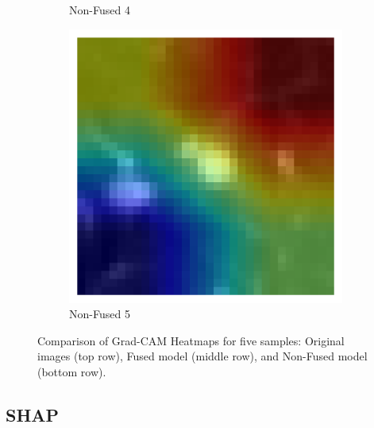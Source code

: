\begin{figure}[htbp]
\begin{subfigure}[b]{0.18\textwidth}
        \caption*{Non-Fused 4}
    \end{subfigure}
    \begin{subfigure}[b]{0.18\textwidth}
        \centering
        \includegraphics[width=\linewidth]{figures/heatmaps/ex5/sample_gradcam_non_fused.png}
        \caption*{Non-Fused 5}
    \end{subfigure}

    \caption[Grad-CAM Heatmap Comparison]{Comparison of Grad-CAM Heatmaps for five samples: Original images (top row), Fused model (middle row), and Non-Fused model (bottom row).}
    \label{fig:heatmap_grid}
\end{figure}


\subsection{SHAP}

